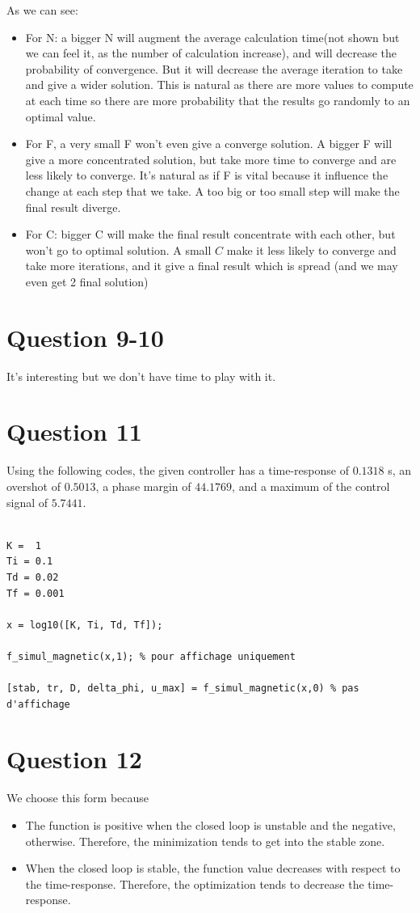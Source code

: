 \documentclass{CSArticle}[english]
\begin{document}
As we can see:
\begin{itemize}
    \item For N: a bigger N will augment the average calculation time(not shown but we can feel it, as the number of calculation increase), and will decrease the probability of convergence. But it will decrease the average iteration to take and give a wider solution. This is natural as there are more values to compute at each time so there are more probability that the results go randomly to an optimal value.
    \item For F, a very small F won't even give a converge solution. A bigger F will give a more concentrated solution, but take more time to converge and are less likely to converge. It's natural as if F is vital because it influence the change at each step that we take. A too big or too small step will make the final result diverge.
    \item For C: bigger C will make the final result concentrate with each other, but won't go to optimal solution. A small $C$ make it less likely to converge and take more iterations, and it give a final result which is spread (and we may even get 2 final solution)
    
\end{itemize}
\section{Question 9-10}
It's interesting but we don't have time to play with it.
\section{Question 11}

Using the following codes, the given controller has a time-response of $0.1318$ s, an overshot of $0.5013$, a phase margin of $44.1769$, and a maximum of the control signal of $5.7441$.

\begin{lstlisting}[style=MATLAB]
%% simul_magnetic function

K =  1
Ti = 0.1
Td = 0.02
Tf = 0.001

x = log10([K, Ti, Td, Tf]);

f_simul_magnetic(x,1); % pour affichage uniquement

[stab, tr, D, delta_phi, u_max] = f_simul_magnetic(x,0) % pas d'affichage
\end{lstlisting}


\section{Question 12}
We choose this form because 
\begin{itemize}
    \item The function is positive when the closed loop is unstable and the negative, otherwise. Therefore, the minimization tends to get into the stable zone.
    \item When the closed loop is stable, the function value decreases with respect to the time-response. Therefore, the optimization tends to decrease the time-response.
\end{itemize}
\end{document}
